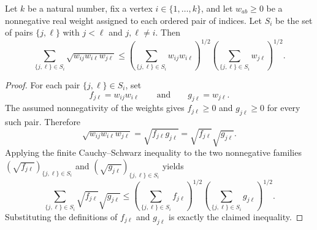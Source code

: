 \begin{helper}
Let $k$ be a natural number, fix a vertex $i\in\{1,\ldots,k\}$, and let
$w_{ab}\ge 0$ be a nonnegative real weight assigned to each ordered pair of
indices.  Let $S_i$ be the set of pairs $\{j,\ell\}$ with $j<\ell$ and
$j,\ell\ne i$.  Then
\[
\sum_{\{j,\ell\}\in S_i}\sqrt{w_{ij}w_{i\ell}w_{j\ell}}
\le
\left(\sum_{\{j,\ell\}\in S_i}w_{ij}w_{i\ell}\right)^{1/2}
\left(\sum_{\{j,\ell\}\in S_i}w_{j\ell}\right)^{1/2}.
\]
\end{helper}
\begin{proof}
For each pair $\{j,\ell\}\in S_i$, set
\[
f_{j\ell}=w_{ij}w_{i\ell}
\qquad\text{and}\qquad
g_{j\ell}=w_{j\ell}.
\]
The assumed nonnegativity of the weights gives $f_{j\ell}\ge 0$ and
$g_{j\ell}\ge 0$ for every such pair.  Therefore
\[
\sqrt{w_{ij}w_{i\ell}w_{j\ell}}
=
\sqrt{f_{j\ell}g_{j\ell}}
=
\sqrt{f_{j\ell}}\sqrt{g_{j\ell}}.
\]
Applying the finite Cauchy--Schwarz inequality to the two nonnegative
families $(\sqrt{f_{j\ell}})_{\{j,\ell\}\in S_i}$ and
$(\sqrt{g_{j\ell}})_{\{j,\ell\}\in S_i}$ yields
\[
\sum_{\{j,\ell\}\in S_i}\sqrt{f_{j\ell}}\sqrt{g_{j\ell}}
\le
\left(\sum_{\{j,\ell\}\in S_i}f_{j\ell}\right)^{1/2}
\left(\sum_{\{j,\ell\}\in S_i}g_{j\ell}\right)^{1/2}.
\]
Substituting the definitions of $f_{j\ell}$ and $g_{j\ell}$ is exactly the
claimed inequality.
\end{proof}
